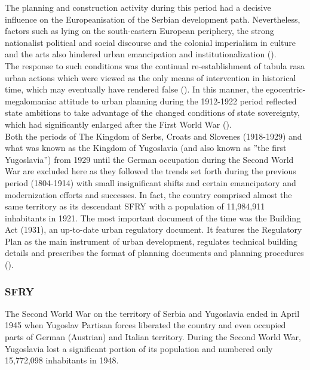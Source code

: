\documentclass[11pt]{report}
\begin{document}
{{{{The planning and construction activity during this period had a decisive influence on the Europeanisation of the Serbian development path. Nevertheless, factors such as lying on the south-eastern European periphery, the strong nationalist political and social discourse and the colonial imperialism in culture and the arts also hindered urban emancipation and institutionalization (\href{Vukmirovic}{\citealt{vukmirovic_city_2013}}).
\\

The response to such conditions was the continual re-establishment of tabula rasa urban actions which were viewed as the only means of intervention in historical time, which may eventually have rendered false (\href{Blagojevic}{\citealt{blagojevic_urban_2009}}). In this manner, the egocentric-megalomaniac attitude to urban planning during the 1912-1922 period reflected state ambitions to take advantage of the changed conditions of state sovereignty, which had significantly enlarged after the First World War (\href{Blagojevic}{\citealt{blagojevic_urban_2009}}).
\\

Both the periods of The Kingdom of Serbs, Croats and Slovenes (1918-1929) and what was known as the Kingdom of Yugoslavia (and also known as ”the first Yugoslavia”) from 1929 until the German occupation during the Second World War are excluded here as they followed the trends set forth during the previous period (1804-1914) with small insignificant shifts and certain emancipatory and modernization efforts and successes. In fact, the country comprised almost the same  territory as its descendant SFRY with a population of 11,984,911 inhabitants in 1921. The most important document of the time was the Building Act (1931), an up-to-date urban regulatory document. It features the Regulatory Plan as the main instrument of urban development, regulates technical building details and prescribes the format of planning documents and planning procedures (\href{Nedovic}{\citealt{nedovicbudic_waves_2006}}).

\subsubsection{SFRY}

The Second World War on the territory of Serbia and Yugoslavia ended in April 1945 when Yugoslav Partisan forces liberated the country and even occupied parts of German (Austrian) and Italian territory. During the Second World War, Yugoslavia lost a significant portion of its population and numbered only 15,772,098 inhabitants in 1948.
\\

}}}}
\end{document}

